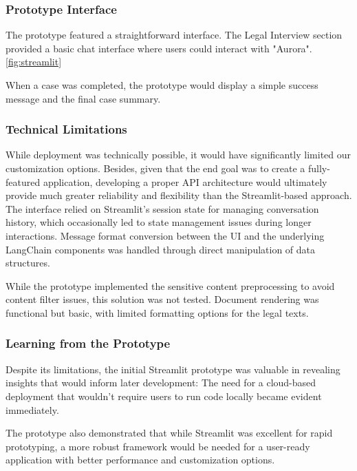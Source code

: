 \subsubsection{Prototype Interface}
The prototype featured a straightforward interface. 
The Legal Interview section provided a basic chat interface where users could interact with "Aurora". \ref{fig:streamlit}

When a case was completed, the prototype would display a simple success message and the final case summary.

\subsubsection{Technical Limitations}

While deployment was technically possible, it would have significantly limited our customization options. Besides, 
given that the end goal was to create a fully-featured application, developing a proper API architecture
would ultimately provide much greater reliability and flexibility than the Streamlit-based approach.
The interface relied on Streamlit's session state for managing conversation history, which occasionally led to state management 
issues during longer interactions. Message format conversion between the UI and the underlying LangChain components was handled 
through direct manipulation of data structures.

While the prototype implemented the sensitive content preprocessing to avoid content filter issues, 
this solution was not tested. Document rendering was functional but basic, 
with limited formatting options for the legal texts.

\subsubsection{Learning from the Prototype}

Despite its limitations, the initial Streamlit prototype was valuable in revealing insights that would inform later development:
The need for a cloud-based deployment that wouldn't require users to run code locally became evident immediately.

The prototype also demonstrated that while Streamlit was excellent for rapid prototyping, a more robust framework would be needed for a user-ready 
application with better performance and customization options.

